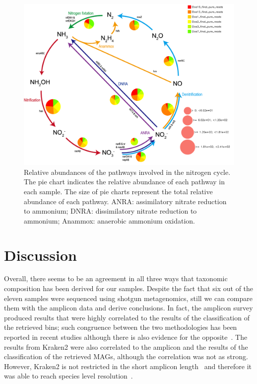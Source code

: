    \begin{figure}[!htbp]
      \centering
      \includegraphics[width=0.98\columnwidth]{figures/nitrogen_cycle_karpathos.png}
      \caption[Relative abundances of the pathways involved in the nitrogen cycle]{
         Relative abundances of the pathways involved in the nitrogen cycle. 
         The pie chart indicates the relative abundance of each pathway in each sample. 
         The size of pie charts represent the total relative abundance of each pathway. 
         ANRA: assimilatory nitrate reduction to ammonium; 
         DNRA: dissimilatory nitrate reduction to ammonium; 
         Anammox: anaerobic ammonium oxidation. 
      }
      \label{fig:karpathos-nitrogen}
   \end{figure}   


\section{Discussion}
\label{swamp:discussion}

   Overall, there seems to be an agreement in all three ways that taxonomic composition has been derived for our samples. 
   Despite the fact that six out of the eleven samples were sequenced using shotgun metagenomics, 
   still we can compare them with the amplicon data and derive conclusions. In fact, the amplicon survey produced results 
   that were highly correlated to the results of the classification of the retrieved bins; 
   such congruence between the two methodologies has been reported in recent studies 
   \citep{chan_diversity_2015, regalado_combining_2020}
   although there is also evidence for the opposite~\citep{tessler_large-scale_2017}. 
   The results from Kraken2 were also correlated to the amplicon and the results of the classification of the retrieved MAGs, 
   although the correlation was not as strong. 
   However, Kraken2 is not restricted in the short amplicon length~\citep{johnson_evaluation_2019} 
   and therefore it was able to reach species level resolution~\citep{lu_ultrafast_2020}.


